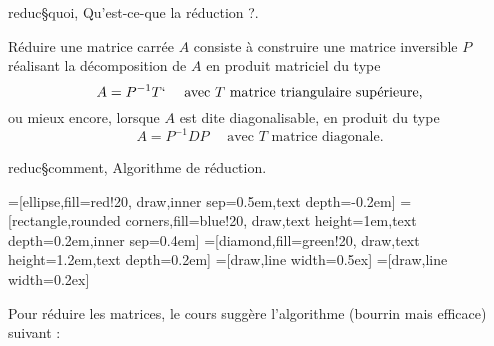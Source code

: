 \Subsection reduc§quoi, Qu'est-ce-que la réduction ?. 

Réduire une matrice carrée $A$ consiste à construire une matrice inversible $P$ réalisant la décomposition de $A$ en produit matriciel du type
\Equation [\bf Trigonalisation de $A$]
$$
A=P^{-1}T`\quad \mbox{ avec $T$ matrice triangulaire supérieure,}
$$
ou mieux encore, lorsque $A$ est dite diagonalisable, en produit du type
\Equation [\bf Diagonalisation de $A$] 
$$
A=P^{-1}DP\quad \mbox{ avec $T$ matrice diagonale.}
$$

\Subsection reduc§comment, Algorithme de réduction.

=[ellipse,fill=red!20, draw,inner sep=0.5em,text depth=-0.2em]
=[rectangle,rounded corners,fill=blue!20, draw,text height=1em,text depth=0.2em,inner sep=0.4em]
=[diamond,fill=green!20, draw,text height=1.2em,text depth=0.2em]
=[draw,line width=0.5ex]
=[draw,line width=0.2ex]

Pour réduire les matrices, le cours suggère l'algorithme (bourrin mais efficace) suivant : 

